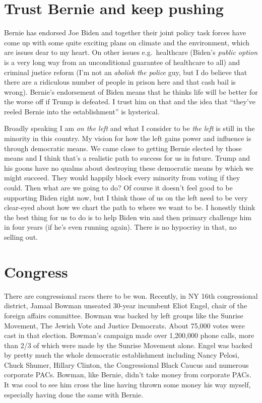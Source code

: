 \documentclass[]{book}
\begin{document}
\hypertarget{trust-bernie-and-keep-pushing}{%
\section{Trust Bernie and keep pushing}\label{trust-bernie-and-keep-pushing}}

Bernie has endorsed Joe Biden and together their joint policy task forces have come up with some quite exciting plans on climate and the environment, which are issues dear to my heart. On other issues e.g.~healthcare (Biden's \emph{public option} is a very long way from an unconditional guarantee of healthcare to all) and criminal justice reform (I'm not an \emph{abolish the police} guy, but I do believe that there are a ridiculous number of people in prison here and that cash bail is wrong). Bernie's endorsement of Biden means that he thinks life will be better for the worse off if Trump is defeated. I trust him on that and the idea that ``they've reeled Bernie into the establishment'' is hysterical.

Broadly speaking I am \emph{on the left} and what I consider to be \emph{the left} is still in the minority in this country. My vision for how the left gains power and influence is through democratic means. We came close to getting Bernie elected by those means and I think that's a realistic path to success for us in future. Trump and his goons have no qualms about destroying these democratic means by which we might succeed. They would happily block every minority from voting if they could. Then what are we going to do? Of course it doesn't feel good to be supporting Biden right now, but I think those of us on the left need to be very clear-eyed about how we chart the path to where we want to be. I honestly think the best thing for us to do is to help Biden win and then primary challenge him in four years (if he's even running again). There is no hypocrisy in that, no selling out.

\hypertarget{congress}{%
\section{Congress}\label{congress}}

There are congressional races there to be won. Recently, in NY 16th congressional district, Jamaal Bowman unseated 30-year incumbent Eliot Engel, chair of the foreign affairs committee. Bowman was backed by left groups like the Sunrise Movement, The Jewish Vote and Justice Democrats. About 75,000 votes were cast in that election. Bowman's campaign made over 1,200,000 phone calls, more than 2/3 of which were made by the Sunrise Movement alone. Engel was backed by pretty much the whole democratic establishment including Nancy Pelosi, Chuck Shumer, Hillary Clinton, the Congressional Black Caucus and numerous corporate PACs. Bowman, like Bernie, didn't take money from corporate PACs. It was cool to see him cross the line having thrown some money his way myself, especially having done the same with Bernie.
\end{document}
